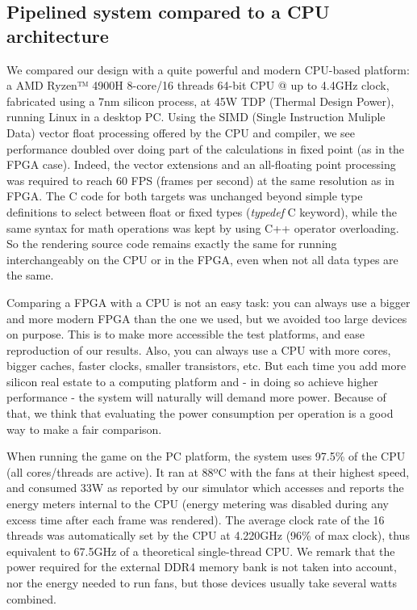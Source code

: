\documentclass[conference]{IEEEtran}
\begin{document}
\subsection{Pipelined system compared to a CPU architecture}

We compared our design with a quite powerful and modern CPU-based platform: a AMD Ryzen™ 4900H 8-core/16 threads 64-bit CPU @ up to 4.4GHz clock, fabricated using a 7nm silicon process, at 45W TDP (Thermal Design Power), running Linux in a desktop PC. Using the SIMD (Single Instruction Muliple Data) vector float processing offered by the CPU and compiler, we see performance doubled over doing part of the calculations in fixed point (as in the FPGA case). Indeed, the vector extensions and an all-floating point processing was required to reach 60 FPS (frames per second) at the same resolution as in FPGA. The C code for both targets was unchanged beyond simple type definitions to select between float or fixed types (\textit{typedef} C keyword), while the same syntax for math operations was kept by using C++ operator overloading. So the rendering source code remains exactly the same for running interchangeably on the CPU or in the FPGA, even when not all data types are the same.

Comparing a FPGA with a CPU is not an easy task: you can always use a bigger and more modern FPGA than the one we used, but we avoided too large devices on purpose. This is to make more accessible the test platforms, and ease reproduction of our results. Also, you can always use a CPU with more cores, bigger caches, faster clocks, smaller transistors, etc. But each time you add more silicon real estate to a computing platform and - in doing so achieve higher performance - the system will naturally will demand more power. Because of that, we think that evaluating the power consumption per operation is a good way to make a fair comparison.

When running the game on the PC platform, the system uses 97.5\% of the CPU (all cores/threads are active). It ran at 88ºC with the fans at their highest speed, and consumed 33W as reported by our simulator which accesses and reports the energy meters internal to the CPU (energy metering was disabled during any excess time after each frame was rendered). The average clock rate of the 16 threads was automatically set by the CPU at 4.220GHz (96\% of max clock), thus equivalent to 67.5GHz of a theoretical single-thread CPU. We remark that the power required for the external DDR4 memory bank is not taken into account, nor the energy needed to run fans, but those devices usually take several watts combined.
\end{document}
